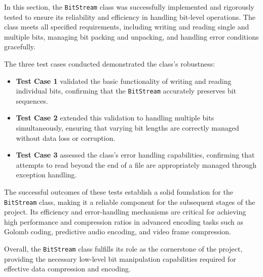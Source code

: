 \documentclass[11pt,twoside,a4paper]{report}
\begin{document}
In this section, the \texttt{BitStream} class was successfully implemented and rigorously tested to ensure its reliability and efficiency in handling bit-level operations. The class meets all specified requirements, including writing and reading single and multiple bits, managing bit packing and unpacking, and handling error conditions gracefully.

The three test cases conducted demonstrated the class's robustness:
\begin{itemize}
    \item \textbf{Test Case 1} validated the basic functionality of writing and reading individual bits, confirming that the \texttt{BitStream} accurately preserves bit sequences.
    \item \textbf{Test Case 2} extended this validation to handling multiple bits simultaneously, ensuring that varying bit lengths are correctly managed without data loss or corruption.
    \item \textbf{Test Case 3} assessed the class's error handling capabilities, confirming that attempts to read beyond the end of a file are appropriately managed through exception handling.
\end{itemize}

The successful outcomes of these tests establish a solid foundation for the \texttt{BitStream} class, making it a reliable component for the subsequent stages of the project. Its efficiency and error-handling mechanisms are critical for achieving high performance and compression ratios in advanced encoding tasks such as Golomb coding, predictive audio encoding, and video frame compression.

Overall, the \texttt{BitStream} class fulfills its role as the cornerstone of the project, providing the necessary low-level bit manipulation capabilities required for effective data compression and encoding.


\printbibliography
\end{document}

